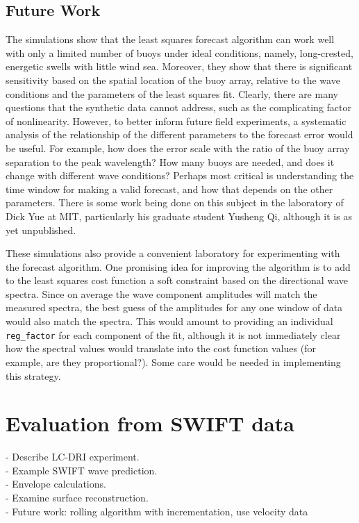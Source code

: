 \documentclass[11pt]{article}
\begin{document}
\subsection{Future Work}
The simulations show that the least squares forecast algorithm can work well with only a limited number of buoys under ideal conditions, namely, long-crested, energetic swells with little wind sea.  Moreover, they show that there is significant sensitivity based on the spatial location of the buoy array, relative to the wave conditions and the parameters of the least squares fit.  Clearly, there are many questions that the synthetic data cannot address, such as the complicating factor of nonlinearity.  However, to better inform future field experiments, a systematic analysis of the relationship of the different parameters to the forecast error would be useful.  For example, how does the error scale with the ratio of the buoy array separation to the peak wavelength?  How many buoys are needed, and does it change with different wave conditions?  Perhaps most critical is understanding the time window for making a valid forecast, and how that depends on the other parameters.  There is some work being done on this subject in the laboratory of Dick Yue at MIT, particularly his graduate student Yusheng Qi, although it is as yet unpublished.

These simulations also provide a convenient laboratory for experimenting with the forecast algorithm.  One promising idea for improving the algorithm is to add to the least squares cost function a soft constraint based on the directional wave spectra.  Since on average the wave component amplitudes will match the measured spectra, the best guess of the amplitudes for any one window of data would also match the spectra.  This would amount to providing an individual \texttt{reg\_factor} for each component of the fit, although it is not immediately clear how the spectral values would translate into the cost function values (for example, are they proportional?).  Some care would be needed in implementing this strategy.

\section{Evaluation from SWIFT data}
- Describe LC-DRI experiment.\\
- Example SWIFT wave prediction.\\
- Envelope calculations.\\
- Examine surface reconstruction.\\
- Future work: rolling algorithm with incrementation, use velocity data\\
\end{document}
